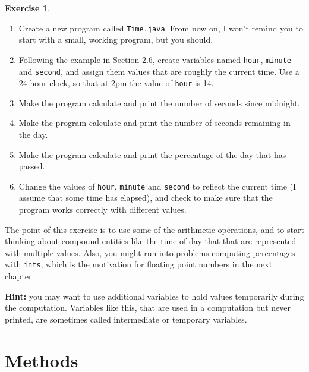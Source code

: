\documentclass[12pt]{book}
\def\HINT{\textbf{Hint:}}
\theoremstyle{definition}
\newtheorem{excz}{Exercise}[chapter]
\newenvironment{exercise}{\bigskip\begin{excz}\mbox{}}{\end{excz}}
\begin{document}
\begin{exercise}

\begin{enumerate}

\item Create a new program called {\tt Time.java}.  From now
on, I won't remind you to start with a small, working program,
but you should.

\item Following the example in Section 2.6, create variables
named {\tt hour}, {\tt minute} and {\tt second}, and assign
them values that are roughly the current time.  Use a 24-hour
clock, so that at 2pm the value of {\tt hour} is 14.

\item Make the program calculate and print the number of
seconds since midnight.

\item Make the program calculate and print the number of
seconds remaining in the day.

\item Make the program calculate and print the percentage of
the day that has passed.

\item Change the values of {\tt hour}, {\tt minute} and {\tt second}
to reflect the current time (I assume that some time has elapsed), and
check to make sure that the program works correctly with different
values.

\end{enumerate}

The point of this exercise is to use some of the arithmetic
operations, and to start thinking about compound entities like the
time of day that that are represented with multiple values.  Also,
you might run into problems computing percentages with {\tt ints},
which is the motivation for floating point numbers in the next
chapter.

\HINT{} you may want to use additional variables to hold values
temporarily during the computation.  Variables like this, that
are used in a computation but never printed, are sometimes called
intermediate or temporary variables.

\end{exercise}



\chapter{Methods}
\label{chap03}
\end{document}
